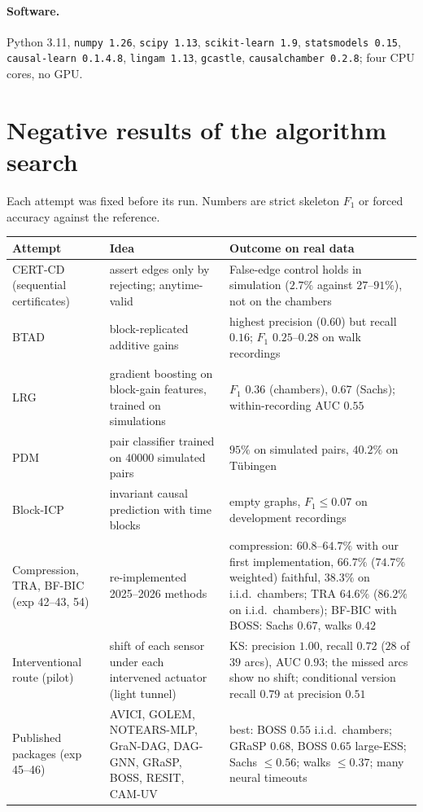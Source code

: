 \paragraph{Software.} Python 3.11, \texttt{numpy 1.26}, \texttt{scipy 1.13}, \texttt{scikit-learn 1.9}, \texttt{statsmodels 0.15}, \texttt{causal-learn 0.1.4.8}, \texttt{lingam 1.13}, \texttt{gcastle}, \texttt{causalchamber 0.2.8}; four CPU cores, no GPU.

\section{Negative results of the algorithm search}\label{app:negative}
Each attempt was fixed before its run. Numbers are strict skeleton $F_1$ or forced accuracy against the reference.
\begingroup\small\setlength{\tabcolsep}{3pt}
\begin{longtable}{@{}p{3.2cm}p{4.3cm}p{7.2cm}@{}}
\toprule
Attempt & Idea & Outcome on real data\\
\midrule
\endhead
CERT-CD (sequential certificates) & assert edges only by rejecting; anytime-valid & False-edge control holds in simulation ($2.7\%$ against $27$--$91\%$), not on the chambers\\
BTAD & block-replicated additive gains & highest precision ($0.60$) but recall $0.16$; $F_1$ $0.25$--$0.28$ on walk recordings\\
LRG & gradient boosting on block-gain features, trained on simulations & $F_1$ $0.36$ (chambers), $0.67$ (Sachs); within-recording AUC $0.55$\\
PDM & pair classifier trained on $40000$ simulated pairs & $95\%$ on simulated pairs, $40.2\%$ on T\"ubingen\\
Block-ICP & invariant causal prediction with time blocks & empty graphs, $F_1\le 0.07$ on development recordings\\
Compression, TRA, BF-BIC (exp 42--43, 54) & re-implemented 2025--2026 methods & compression: $60.8$--$64.7\%$ with our first implementation, $66.7\%$ ($74.7\%$ weighted) faithful, $38.3\%$ on i.i.d.\ chambers; TRA $64.6\%$ ($86.2\%$ on i.i.d.\ chambers); BF-BIC with BOSS: Sachs $0.67$, walks $0.42$\\
Interventional route (pilot) & shift of each sensor under each intervened actuator (light tunnel) & KS: precision $1.00$, recall $0.72$ ($28$ of $39$ arcs), AUC $0.93$; the missed arcs show no shift; conditional version recall $0.79$ at precision $0.51$\\
Published packages (exp 45--46) & AVICI, GOLEM, NOTEARS-MLP, GraN-DAG, DAG-GNN, GRaSP, BOSS, RESIT, CAM-UV & best: BOSS $0.55$ i.i.d.\ chambers; GRaSP $0.68$, BOSS $0.65$ large-ESS; Sachs $\le0.56$; walks $\le0.37$; many neural timeouts\\

\end{longtable}
